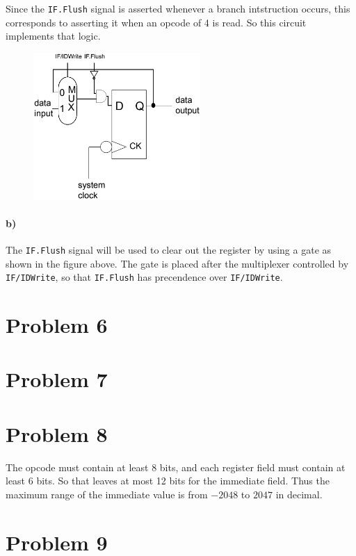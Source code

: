 \documentclass[12pt]{article}
\begin{document}
Since the \texttt{IF.Flush} signal is asserted whenever a branch intstruction occurs, this corresponds to asserting it when an opcode of 4 is read. So this
circuit implements that logic.

\begin{figure}[!ht]
        \begin{center}
                \includegraphics[width=2.5in]{problem5b.png}
        \end{center}
\end{figure}

\paragraph{b)}

The \texttt{IF.Flush} signal will be used to clear out the register by using a gate as shown in the figure above. The gate is placed after the
multiplexer controlled by \texttt{IF/IDWrite}, so that \texttt{IF.Flush} has precendence over \texttt{IF/IDWrite}.

\section*{Problem 6}

\section*{Problem 7}

\section*{Problem 8}

The opcode must contain at least 8 bits, and each register field must contain at least 6 bits. So that leaves at most 12 bits for the immediate field.
Thus the maximum range of the immediate value is from \(-2048\) to \(2047\) in decimal.

\section*{Problem 9}
\end{document}
